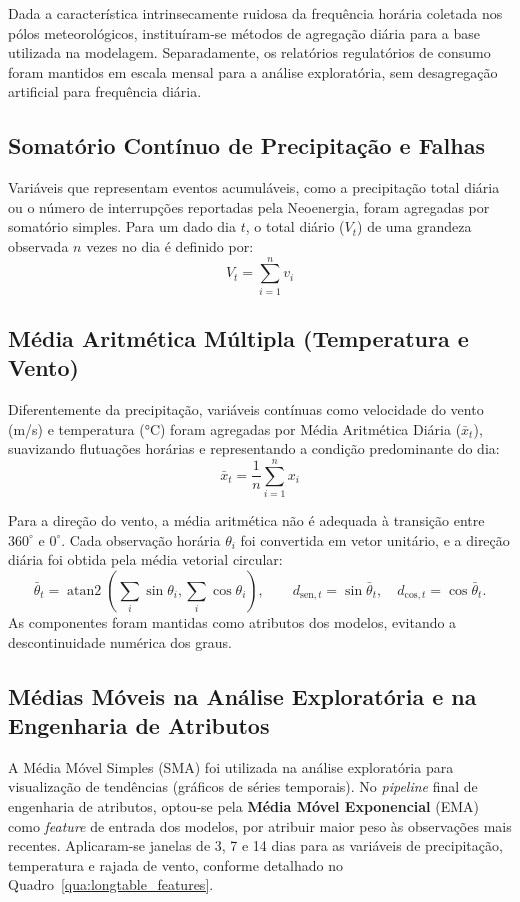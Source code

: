 Dada a característica intrinsecamente ruidosa da frequência horária coletada nos pólos meteorológicos, instituíram-se métodos de agregação diária para a base utilizada na modelagem. Separadamente, os relatórios regulatórios de consumo foram mantidos em escala mensal para a análise exploratória, sem desagregação artificial para frequência diária.

\subsection{Somatório Contínuo de Precipitação e Falhas}
Variáveis que representam eventos acumuláveis, como a precipitação total diária ou o número de interrupções reportadas pela Neoenergia, foram agregadas por somatório simples. Para um dado dia $t$, o total diário ($V_t$) de uma grandeza observada $n$ vezes no dia é definido por:
\begin{equation}
    V_t = \sum_{i=1}^{n} v_i
\end{equation}

\subsection{Média Aritmética Múltipla (Temperatura e Vento)}
Diferentemente da precipitação, variáveis contínuas como velocidade do vento (m/s) e temperatura (°C) foram agregadas por Média Aritmética Diária ($\bar{x}_t$), suavizando flutuações horárias e representando a condição predominante do dia:
\begin{equation}
    \bar{x}_t = \frac{1}{n} \sum_{i=1}^{n} x_i
\end{equation}

Para a direção do vento, a média aritmética não é adequada à transição entre $360^\circ$ e $0^\circ$. Cada observação horária $\theta_i$ foi convertida em vetor unitário, e a direção diária foi obtida pela média vetorial circular:
\begin{equation}
    \bar{\theta}_t = \operatorname{atan2}\!\left(\sum_i \sin\theta_i,\sum_i \cos\theta_i\right), \qquad
    d_{\mathrm{sen},t}=\sin\bar{\theta}_t,\quad d_{\mathrm{cos},t}=\cos\bar{\theta}_t.
\end{equation}
As componentes foram mantidas como atributos dos modelos, evitando a descontinuidade numérica dos graus.

\subsection{Médias Móveis na Análise Exploratória e na Engenharia de Atributos}
A Média Móvel Simples (SMA) foi utilizada na análise exploratória para visualização de tendências (gráficos de séries temporais). No \textit{pipeline} final de engenharia de atributos, optou-se pela \textbf{Média Móvel Exponencial} (EMA) como \textit{feature} de entrada dos modelos, por atribuir maior peso às observações mais recentes. Aplicaram-se janelas de 3, 7 e 14 dias para as variáveis de precipitação, temperatura e rajada de vento, conforme detalhado no Quadro~\ref{qua:longtable_features}.

